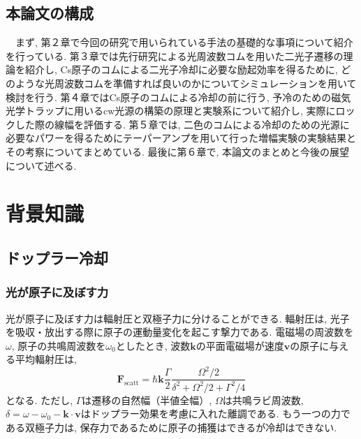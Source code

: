 \documentclass[uplatex, dvipdfmx, a4paper, report, papersize, 11pt]{jsbook}
\begin{document}
\section{本論文の構成}
　まず, 第２章で今回の研究で用いられている手法の基礎的な事項について紹介を行っている. 第３章では先行研究による光周波数コムを用いた二光子遷移の理論を紹介し, Cs原子のコムによる二光子冷却に必要な励起効率を得るために, どのような光周波数コムを準備すれば良いのかについてシミュレーションを用いて検討を行う. 第４章ではCs原子のコムによる冷却の前に行う, 予冷のための磁気光学トラップに用いるcw光源の構築の原理と実験系について紹介し, 実際にロックした際の線幅を評価する. 第５章では, 二色のコムによる冷却のための光源に必要なパワーを得るためにテーパーアンプを用いて行った増幅実験の実験結果とその考察についてまとめている. 最後に第６章で, 本論文のまとめと今後の展望について述べる.
\newpage

\chapter{背景知識}

\section{ドップラー冷却}
\subsection{光が原子に及ぼす力}
 光が原子に及ぼす力は輻射圧と双極子力に分けることができる. 輻射圧は, 光子を吸収・放出する際に原子の運動量変化を起こす撃力である\cite{ノーベル賞と分光学}.
 電磁場の周波数を$\omega$, 原子の共鳴周波数を$\omega_0$としたとき, 波数$\bm k$の平面電磁場が速度$\bm v$の原子に与える平均輻射圧は,
 \begin{equation}\label{scattering_force}
\bm{F} _ { \mathrm { scatt } } = \hbar \bm{k}\frac { \Gamma } { 2 } \frac { \Omega ^ { 2 } / 2 } { \delta ^ { 2 } + \Omega ^ { 2 } / 2 + \Gamma ^ { 2 } / 4 }
 \end{equation}
となる\cite{Foot:1080846}. ただし, $\Gamma$は遷移の自然幅（半値全幅）, $\Omega$は共鳴ラビ周波数, $\delta = \omega - \omega _ { 0 } - \bm{k} \cdot \bm{v}$はドップラー効果を考慮に入れた離調である. もう一つの力である双極子力は, 保存力であるために原子の捕獲はできるが冷却はできない\cite{ノーベル賞と分光学}.
\end{document}
